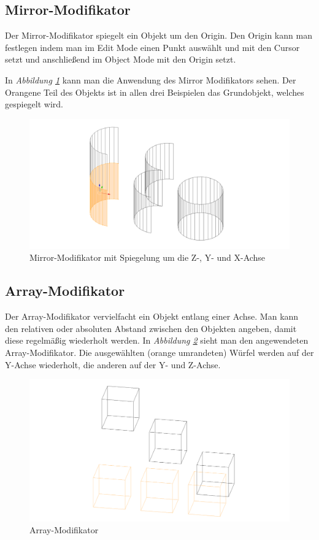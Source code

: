 \subsection{Mirror-Modifikator\citep{blender:mirror_modifier}}
\label{Mirror:heading}
Der Mirror-Modifikator spiegelt ein Objekt um den Origin.
Den Origin kann man festlegen indem man im Edit Mode einen Punkt auswählt
und mit   den Cursor setzt und anschließend im Object Mode mit 
 den Origin setzt.

In \textit{Abbildung \ref{modifikatoren:image2}} kann man die Anwendung des Mirror Modifikators sehen. Der Orangene Teil des Objekts ist in allen drei Beispielen das
Grundobjekt, welches gespiegelt wird.

\begin{figure}[h]
    \centering
    \includegraphics[width=.8\textwidth]{images/Modifikatoren-Mirror.png}
    \caption{Mirror-Modifikator mit Spiegelung um die Z-, Y- und X-Achse}
    \label{modifikatoren:image2}
\end{figure}

\subsection{Array-Modifikator\citep{blender:array_modifier}}
\label{Array:heading}
Der Array-Modifikator vervielfacht ein Objekt entlang einer Achse. Man kann den relativen oder absoluten Abstand zwischen den Objekten
angeben, damit diese regelmäßig wiederholt werden. In \textit{Abbildung \ref{modifikatoren:image3}} sieht man den angewendeten Array-Modifikator.
Die ausgewählten (orange umrandeten) Würfel werden auf der Y-Achse
wiederholt, die anderen auf der Y- und Z-Achse.
\begin{figure}[h]
    \centering
    \includegraphics[width=.8\textwidth]{images/Modifikatoren-Array.png}
    \caption{Array-Modifikator}
    \label{modifikatoren:image3}
\end{figure}

